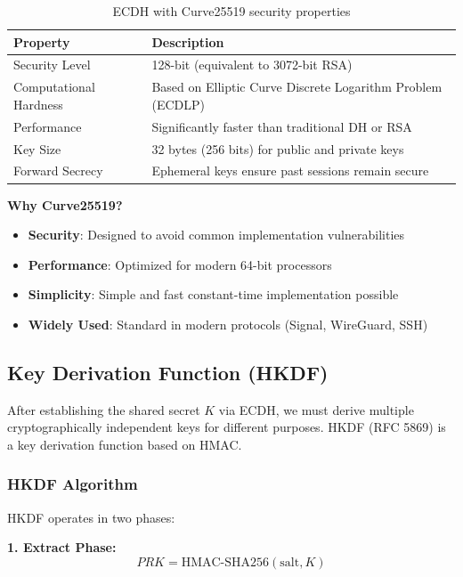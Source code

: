 \documentclass[12pt,a4paper]{article}
\begin{document}
\begin{table}[H]
\centering
\begin{tabular}{@{}lp{9cm}@{}}
\toprule
\textbf{Property} & \textbf{Description} \\ \midrule
Security Level & 128-bit (equivalent to 3072-bit RSA) \\
Computational Hardness & Based on Elliptic Curve Discrete Logarithm Problem (ECDLP) \\
Performance & Significantly faster than traditional DH or RSA \\
Key Size & 32 bytes (256 bits) for public and private keys \\
Forward Secrecy & Ephemeral keys ensure past sessions remain secure \\
\bottomrule
\end{tabular}
\caption{ECDH with Curve25519 security properties}
\end{table}

\textbf{Why Curve25519?}

\begin{itemize}
    \item \textbf{Security}: Designed to avoid common implementation vulnerabilities
    \item \textbf{Performance}: Optimized for modern 64-bit processors
    \item \textbf{Simplicity}: Simple and fast constant-time implementation possible
    \item \textbf{Widely Used}: Standard in modern protocols (Signal, WireGuard, SSH)
\end{itemize}

\subsection{Key Derivation Function (HKDF)}

After establishing the shared secret $K$ via ECDH, we must derive multiple cryptographically independent keys for different purposes. HKDF (RFC 5869) is a key derivation function based on HMAC.

\subsubsection{HKDF Algorithm}

HKDF operates in two phases:

\textbf{1. Extract Phase:}
\begin{equation}
PRK = \text{HMAC-SHA256}(\text{salt}, K)
\end{equation}
\end{document}
